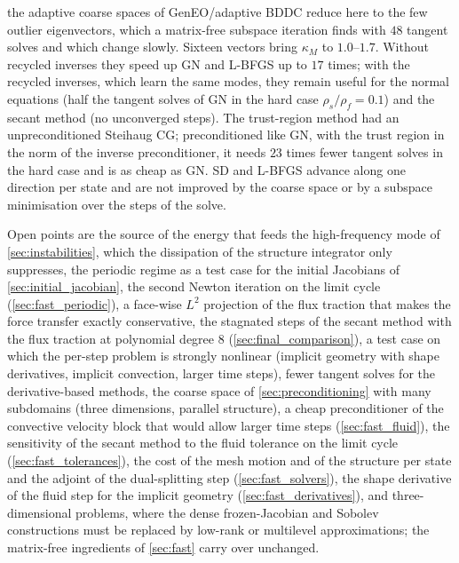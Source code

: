 \documentclass[11pt,a4paper]{article}
\theoremstyle{definition}
\theoremstyle{remark}
\newcommand{\M}{M}
\begin{document}
\begin{enumerate}
the adaptive coarse spaces of GenEO/adaptive BDDC reduce here to the few outlier eigenvectors, which
a matrix-free subspace iteration finds with $48$ tangent solves and which change slowly. Sixteen
vectors bring $\kappa_{\M}$ to $1.0$--$1.7$. Without recycled inverses they speed up GN and L-BFGS
up to $17$ times; with the recycled inverses, which learn the same modes, they remain useful for
the normal equations (half the tangent solves of GN in the hard case $\rho_s/\rho_f=0.1$) and the
secant method (no unconverged steps). The trust-region method had an unpreconditioned Steihaug CG;
preconditioned like GN, with the trust region in the norm of the inverse preconditioner, it needs
$23$ times fewer tangent solves in the hard case and is as cheap as GN. SD and L-BFGS advance along
one direction per state and are not improved by the coarse space or by a subspace minimisation
over the steps of the solve.
\end{enumerate}
Open points are the source of the energy that feeds the high-frequency mode of
\cref{sec:instabilities}, which the dissipation of the structure integrator only suppresses, the
periodic regime as a test case for the initial Jacobians of
\cref{sec:initial_jacobian}, the second Newton iteration on the limit cycle
(\cref{sec:fast_periodic}), a face-wise $L^2$ projection of the flux traction that makes the force
transfer exactly conservative, the stagnated steps of the secant method with the flux traction at
polynomial degree $8$ (\cref{sec:final_comparison}), a test case on which the per-step problem is strongly nonlinear
(implicit geometry with shape derivatives, implicit convection, larger time steps), fewer tangent solves for the derivative-based methods, the coarse space of \cref{sec:preconditioning} with many subdomains (three dimensions, parallel structure), a cheap
preconditioner of the convective velocity block that would allow larger time steps
(\cref{sec:fast_fluid}), the sensitivity
of the secant method to the fluid tolerance on the limit cycle (\cref{sec:fast_tolerances}), the
cost of the mesh motion and of the structure per state and the adjoint of the dual-splitting step
(\cref{sec:fast_solvers}), the shape derivative of the fluid step for the implicit geometry
(\cref{sec:fast_derivatives}), and three-dimensional problems, where the dense frozen-Jacobian and
Sobolev constructions must be replaced by low-rank or multilevel approximations; the matrix-free
ingredients of \cref{sec:fast} carry over unchanged.

\appendix
\end{document}

